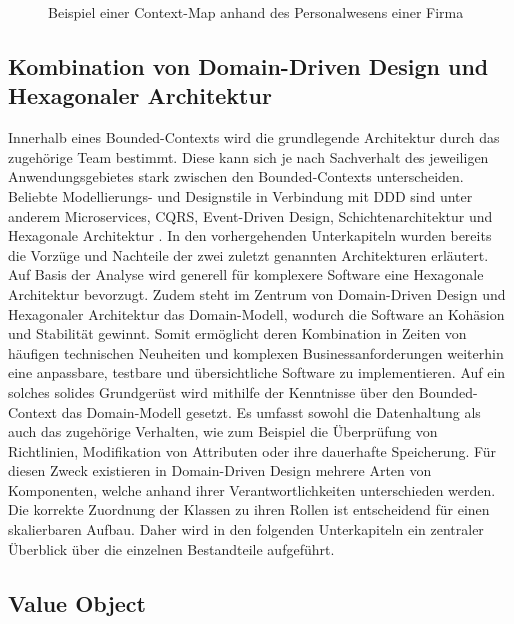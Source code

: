 \begin{figure}
	\centering
	\footnotesize
	
	\caption{Beispiel einer Context-Map anhand des Personalwesens einer Firma}
	\label{fig:Context-Map-Example}
\end{figure}

\subsection{Kombination von Domain-Driven Design und Hexagonaler Architektur}

Innerhalb eines Bounded-Contexts wird die grundlegende Architektur durch das zugehörige Team bestimmt. Diese kann sich je nach Sachverhalt des jeweiligen Anwendungsgebietes stark zwischen den Bounded-Contexts unterscheiden. Beliebte Modellierungs- und Designstile in Verbindung mit DDD sind unter anderem Microservices, \acrshort{CQRS}, Event-Driven Design, Schichtenarchitektur und Hexagonale Architektur \cite[S. 113ff.]{Vernon.2015}. In den vorhergehenden Unterkapiteln wurden bereits die Vorzüge und Nachteile der zwei zuletzt genannten Architekturen erläutert. Auf Basis der Analyse wird generell für komplexere Software eine Hexagonale Architektur bevorzugt. Zudem steht im Zentrum von Domain-Driven Design und Hexagonaler Architektur das Domain-Modell, wodurch die Software an Kohäsion und Stabilität gewinnt. Somit ermöglicht deren Kombination in Zeiten von häufigen technischen Neuheiten und komplexen Businessanforderungen weiterhin eine anpassbare, testbare und übersichtliche Software zu implementieren. Auf ein solches solides Grundgerüst wird mithilfe der Kenntnisse über den Bounded-Context das Domain-Modell gesetzt. Es umfasst sowohl die Datenhaltung als auch das zugehörige Verhalten, wie zum Beispiel die Überprüfung von Richtlinien, Modifikation von Attributen oder ihre dauerhafte Speicherung. Für diesen Zweck existieren in Domain-Driven Design mehrere Arten von Komponenten, welche anhand ihrer Verantwortlichkeiten unterschieden werden. Die korrekte Zuordnung der Klassen zu ihren Rollen ist entscheidend für einen skalierbaren Aufbau. Daher wird in den folgenden Unterkapiteln ein zentraler Überblick über die einzelnen Bestandteile aufgeführt.

\subsection{Value Object}

